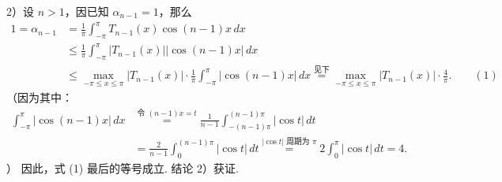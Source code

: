 \documentclass[UTF8,12pt,a4paper,fontset=fandol]{ctexart}
\providecommand{\xlongequal}[1]{\stackrel{#1}{=}}
\begin{document}
2）设 $n>1$，因已知 $\alpha_{n-1}=1$，那么
\[
\begin{aligned}
1=\alpha_{n-1}
&=\frac1\pi\int_{-\pi}^{\pi}T_{n-1}(x)\cos(n-1)x\,dx\\
&\le\frac1\pi\int_{-\pi}^{\pi}|T_{n-1}(x)||\cos(n-1)x|\,dx\\
&\le\max_{-\pi\le x\le\pi}|T_{n-1}(x)|\cdot
\frac1\pi\int_{-\pi}^{\pi}|\cos(n-1)x|\,dx
\xlongequal{\text{见下}}
\max_{-\pi\le x\le\pi}|T_{n-1}(x)|\cdot\frac4\pi. \qquad(1)
\end{aligned}
\]
（因为其中：
\[
\begin{aligned}
\int_{-\pi}^{\pi}|\cos(n-1)x|\,dx
&\xlongequal{\text{令 }(n-1)x=t}
\frac1{n-1}\int_{-(n-1)\pi}^{(n-1)\pi}|\cos t|\,dt\\
&=\frac2{n-1}\int_0^{(n-1)\pi}|\cos t|\,dt
\xlongequal{|\cos t|\text{ 周期为 }\pi}
2\int_0^{\pi}|\cos t|\,dt=4.
\end{aligned}
\]
）
因此，式 (1) 最后的等号成立. 结论 2）获证.
\end{document}
